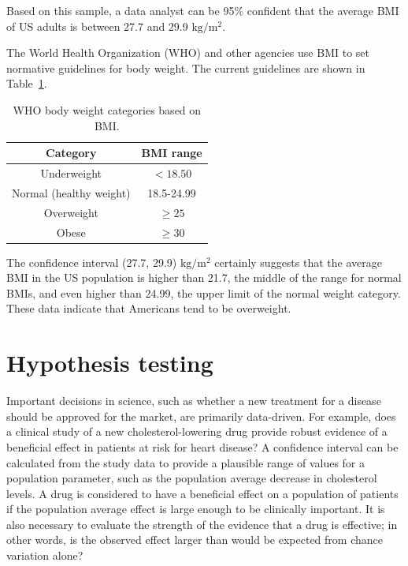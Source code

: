 \begin{example}
	Based on this sample, a data analyst can be 95\% confident that the average BMI of US adults is between 27.7 and 29.9 $\text{kg}/\text{m}{^2}$.

The World Health Organization (WHO) and other agencies use BMI to set normative guidelines for body weight. The current guidelines are shown in Table~\ref{whoBmiGuidelines}. 


\begin{table}[h!]
	\begin{center}
		\begin{tabular}{|c|c|}
			\hline 
			Category & BMI range\tabularnewline
			\hline 
			\hline 
			Underweight & $<18.50$\tabularnewline
			\hline 
			Normal (healthy weight) & 18.5-24.99\tabularnewline
			\hline 
			Overweight & $\geq 25$\tabularnewline
			\hline 
			Obese & $\geq30$\tabularnewline
			\hline
		\end{tabular}
		\caption{WHO body weight categories based on BMI.} 
		\label{whoBmiGuidelines}
	\end{center}
\end{table}

The confidence interval (27.7, 29.9) $\text{kg}/\text{m}{^2}$ certainly suggests that the average BMI in the US population is higher than 21.7, the middle of the range for normal BMIs, and even higher than 24.99, the upper limit of the normal weight category. These data indicate that Americans tend to be overweight. 

\end{example}



\section[Hypothesis testing]{Hypothesis testing} %
\label{hypothesisTesting}


Important decisions in science, such as whether a new treatment for a disease should be approved for the market, are primarily data-driven. For example, does a clinical study of a new cholesterol-lowering drug provide robust evidence of a beneficial effect in patients at risk for heart disease? A confidence interval can be calculated from the study data to provide a plausible range of values for a population parameter, such as the population average decrease in cholesterol levels. A drug is considered to have a beneficial effect on a population of patients if the population average effect is large enough to be clinically important. It is also necessary to evaluate the strength of the evidence that a drug is effective; in other words, is the observed effect larger than would be expected from chance variation alone?

